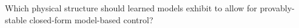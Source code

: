 \begin{researchquestion}\label{rq:physical_structure_learned_models}
    Which physical structure should learned models exhibit to allow for provably-stable closed-form model-based control?
\end{researchquestion}

